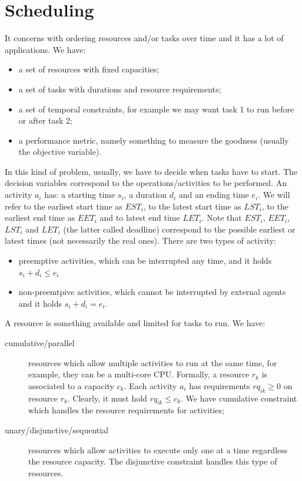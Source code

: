 \documentclass[10pt,a4paper]{article}
\begin{document}
\section{Scheduling}
It concerns with ordering resources and/or tasks over time and it has a lot of
applications. We have:
\begin{itemize}
    \item a set of resources with fixed capacities;
    \item a set of tasks with durations and resource requirements;
    \item a set of temporal constraints, for example we may want task 1 to run
    before or after task 2;
    \item a performance metric, namely something to measure the goodness
    (usually the objective variable).
\end{itemize}
In this kind of problem, usually, we have to decide when tasks have to start.
The decision variables correspond to the operations/activities to be performed.
An activity $a_i$ has: a starting time $s_i$, a duration $d_i$ and an ending
time $e_i$. We will refer to the earliest start time as $EST_i$, to the latest
start time as $LST_i$, to the earliest end time as $EET_i$ and to latest end
time $LET_i$. Note that $EST_i$, $EET_i$, $LST_i$ and $LET_i$ (the latter called
deadline) correspond to the possible earliest or latest times (not necessarily
the real ones). There are two types of activity:
\begin{itemize}
    \item preemptive activities, which can be interrupted any time, and it holds
    $s_i + d_i \leq e_i $
    \item non-preemtpive activities, which cannot be interrupted by external
    agents and it holds $s_i + d_i = e_i $.
\end{itemize}

A resource is something available and limited for tasks to run. We have:
\begin{description}
    \item[cumulative/parallel] resources which allow multiple activities to run
    at the same time, for example, they can be a multi-core CPU. Formally, a
    resource $r_k$ is associated to a capacity $c_k$. Each activity $a_i$ has
    requirements $rq_{ik} \geq 0$ on resource $r_k$. Clearly, it must hold
    $rq_{ik} \leq c_k$. We have cumulative constraint which handles the resource
    requirements for activities;
    \item[unary/disjunctive/sequential] resources which allow activities to
    execute only one at a time regardless the resource capacity. The disjunctive
    constraint handles this type of resources.
\end{description}
\end{document}
